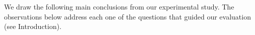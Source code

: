 %

We draw the following main conclusions from our experimental study.
The observations below address each one of the questions that guided our
evaluation (see Introduction).

